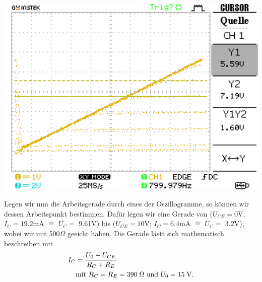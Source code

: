 \documentclass[10pt]{article}
\newenvironment{Figure}
  {\par\medskip\noindent\minipage{\linewidth}}
  {\endminipage\par\medskip}
\begin{document}
\begin{multicols}{2}
\begin{Figure}
		\centering\includegraphics[width=1\textwidth]{../data/Kennlinie4_npn.png}
		\label{fig:1.5}
	\end{Figure}

	Legen wir nun die Arbeitsgerade durch eines der Oszillogramme, so können wir dessen Arbeitspunkt bestimmen. Dafür legen wir eine Gerade von ($U_{CE} = 0$\;V; $I_C = 19.2$\;mA $\hat{=}$ $U_C=$ 9.61\;V) bis ($U_{CE} = 10$\;V; $I_C = 6.4$\;mA $\hat{=}$ $U_C=$ 3.2\;V), wobei wir mit 500\;$\Omega$ geeicht haben. Die Gerade lästt sich mathematisch beschreiben mit
	\begin{align*}
		I_C & = \frac{U_0 - U_{CE}}{R_C + R_E}                                        \\
		    & \text{mit } R_C=R_E=390\text{\;}\Omega \text{ und } U_0 = 15\text{\;V.}
	\end{align*}


\end{multicols}
\end{document}
